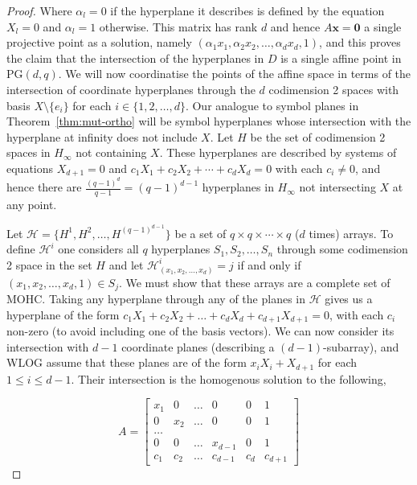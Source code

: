 \documentclass{article}
\newcommand{\PG}{\mathrm{PG}}
\begin{document}
\begin{proof}
  Where \(\alpha_l = 0\) if the hyperplane it describes is defined by the equation \(X_l = 0\) and \(\alpha_l = 1\) otherwise.
  This matrix has rank \(d\) and hence \(A \mathbf{x} = \mathbf{0}\) a single projective point as a solution, namely \((\alpha_1 x_1, \alpha_2 x_2, \ldots, \alpha_d x_d, 1)\), and this proves the claim that the intersection of the hyperplanes in \(D\) is a single affine point in \(\PG(d, q)\). We will now coordinatise the points of the affine space in terms of
  the intersection of coordinate hyperplanes through the \(d\) codimension 2 spaces with basis \(X \setminus \{e_{i}\}\) for each \(i \in \{1, 2, \ldots, d\}\).
  Our analogue to symbol planes in Theorem~\ref{thm:mut-ortho} will be symbol hyperplanes whose intersection with the hyperplane at infinity does not include \(X\). Let \(H\) be the set of codimension 2 spaces in \(H_{\infty}\) not containing \(X\).
  These hyperplanes are described by systems of equations \(X_{d + 1} = 0\) and \(c_{1}X_{1} + c_{2} X_{2} + \cdots + c_{d}X_{d} = 0\) with each \(c_{i} \ne 0\), and hence there are \(\frac{(q - 1)^{d}}{q - 1} = (q - 1)^{d - 1}\) hyperplanes in \(H_{\infty}\) not intersecting \(X\) at any point.

  Let \(\mathcal{H} = \{H^{1}, H^{2}, \ldots, H^{{(q - 1)}^{d - 1}}\}\) be a set of \(q \times q \times \cdots \times q\) (\(d\) times) arrays. To define \(\mathcal{H}^{i}\) one considers all \(q\) hyperplanes \(S_{1}, S_{2}, \ldots, S_{n}\) through some codimension 2 space in the set \(H\) and let \(\mathcal{H}^{i}_{(x_{1}, x_{2}, \ldots, x_{d})} = j\) if and only if \((x_{1}, x_{2}, \ldots, x_{d}, 1) \in S_{j}\).
  We must show that these arrays are a complete set of MOHC.
  Taking any hyperplane through any of the planes in \(\mathcal{H}\) gives us a hyperplane of the form \(c_1X_1 + c_2X_2 + \ldots + c_d X_d + c_{d + 1}X_{d + 1} = 0\), with each \(c_i\) non-zero (to avoid including one of the basis vectors).
  We can now consider its intersection with \(d - 1\) coordinate planes (describing a \((d - 1)\)-subarray), and WLOG assume that these planes are of the form \(x_i X_i + X_{d + 1}\) for each \(1 \leq i \leq d - 1\). Their intersection is the homogenous solution to the following,

  \begin{equation*}
    A = \begin{bmatrix}
      x_1 & 0 & \ldots & 0 & 0 & 1 \\
      0 & x_2 & \ldots & 0 & 0 & 1 \\
      \ldots \\
      0 & 0 & \ldots & x_{d - 1} & 0 & 1 \\
      c_1 & c_2 & \ldots & c_{d - 1} & c_d & c_{d + 1}
    \end{bmatrix}
  \end{equation*}


\end{proof}
\end{document}
